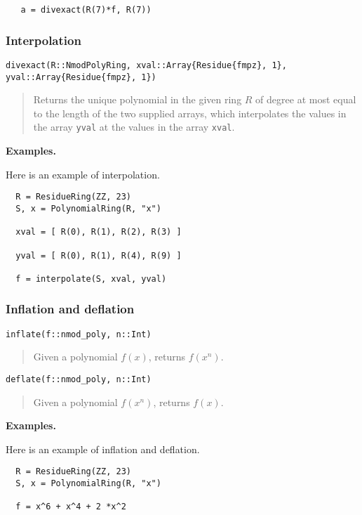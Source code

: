 \documentclass[a4paper,10pt]{article}
\newcommand{\code}{\lstinline}
\newcommand{\desc}[1]{\vspace{-3mm}\begin{quote}#1\end{quote}}
\begin{document}
{{\begin{lstlisting}
   a = divexact(R(7)*f, R(7)) 
\end{lstlisting}

\subsubsection{Interpolation}

\begin{lstlisting}
divexact(R::NmodPolyRing, xval::Array{Residue{fmpz}, 1}, yval::Array{Residue{fmpz}, 1})
\end{lstlisting}

\desc{Returns the unique polynomial in the given ring $R$ of degree at most equal to the
length of the two supplied arrays, which interpolates the values in the array \code{yval}
at the values in the array \code{xval}.}

\textbf{Examples.}

Here is an example of interpolation.

\begin{lstlisting}
  R = ResidueRing(ZZ, 23)
  S, x = PolynomialRing(R, "x")

  xval = [ R(0), R(1), R(2), R(3) ]

  yval = [ R(0), R(1), R(4), R(9) ] 

  f = interpolate(S, xval, yval)
\end{lstlisting}

\subsubsection{Inflation and deflation}

\begin{lstlisting}
inflate(f::nmod_poly, n::Int)
\end{lstlisting}

\desc{Given a polynomial $f(x)$, returns $f(x^n)$.}

\begin{lstlisting}
deflate(f::nmod_poly, n::Int)
\end{lstlisting}

\desc{Given a polynomial $f(x^n)$, returns $f(x)$.}

\textbf{Examples.}

Here is an example of inflation and deflation.

\begin{lstlisting}
  R = ResidueRing(ZZ, 23)
  S, x = PolynomialRing(R, "x")

  f = x^6 + x^4 + 2 *x^2 


\end{lstlisting}}}
\end{document}

